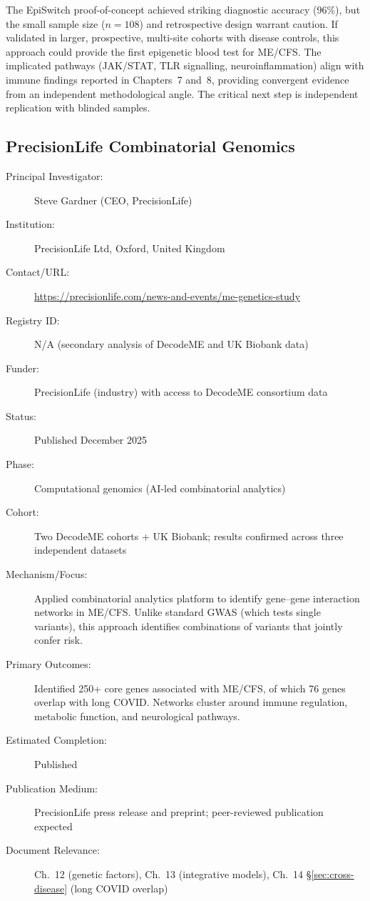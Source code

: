 The EpiSwitch proof-of-concept achieved striking diagnostic accuracy (96\%),
but the small sample size ($n=108$) and retrospective design warrant caution.
If validated in larger, prospective, multi-site cohorts with disease controls,
this approach could provide the first epigenetic blood test for ME/CFS.  The
implicated pathways (JAK/STAT, TLR signalling, neuroinflammation) align with
immune findings reported in Chapters~7 and~8, providing convergent evidence
from an independent methodological angle.  The critical next step is
independent replication with blinded samples.

\subsection{PrecisionLife Combinatorial Genomics}
\label{sec:registry-precisionlife}

\begin{description}
    \item[Principal Investigator:] Steve Gardner (CEO, PrecisionLife)
    \item[Institution:] PrecisionLife Ltd, Oxford, United Kingdom
    \item[Contact/URL:] \url{https://precisionlife.com/news-and-events/me-genetics-study}
    \item[Registry ID:] N/A (secondary analysis of DecodeME and UK Biobank data)
    \item[Funder:] PrecisionLife (industry) with access to DecodeME consortium
        data
    \item[Status:] Published December 2025
    \item[Phase:] Computational genomics (AI-led combinatorial analytics)
    \item[Cohort:] Two DecodeME cohorts + UK Biobank; results confirmed across
        three independent datasets
    \item[Mechanism/Focus:] Applied combinatorial analytics platform to
        identify gene--gene interaction networks in ME/CFS.  Unlike standard
        GWAS (which tests single variants), this approach identifies
        combinations of variants that jointly confer risk.
    \item[Primary Outcomes:] Identified 250+ core genes associated with
        ME/CFS, of which 76 genes overlap with long COVID.  Networks cluster
        around immune regulation, metabolic function, and neurological pathways.
    \item[Estimated Completion:] Published
    \item[Publication Medium:] PrecisionLife press release and preprint;
        peer-reviewed publication expected
    \item[Document Relevance:] Ch.~12 (genetic factors), Ch.~13 (integrative
        models), Ch.~14 \S\ref{sec:cross-disease} (long COVID overlap)
\end{description}

